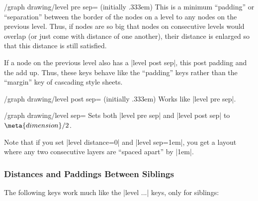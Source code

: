 \begin{key}{/graph drawing/level pre sep= (initially .333em)}
  This is a minimum ``padding'' or ``separation'' between the border
  of the nodes on a level to any nodes on the previous level. Thus, if
  nodes are so big that nodes on consecutive levels would overlap (or
  just come with  distance of one another), their
  distance is enlarged so that this distance is still satisfied.

  If a node on the previous level also has a |level post sep|, this
  post padding and the  add up. Thus, these keys
  behave like the ``padding'' keys rather
  than the ``margin'' key of cascading style sheets.
  
\begin{codeexample}[]
\end{codeexample}
\end{key}

\begin{key}{/graph drawing/level post sep= (initially .333em)}
  Works like |level pre sep|.
\end{key}

\begin{key}{/graph drawing/level sep=}
  Sets both |level pre sep| and |level post sep| to
  $\meta{dimension}/2$.
\end{key}

Note that if you set |level distance=0| and |level sep=1em|, you get
a layout where any two consecutive layers are ``spaced apart'' by
|1em|.


\subsubsection{Distances and Paddings Between Siblings}

The following keys work much like the |level ...| keys, only for
siblings:

